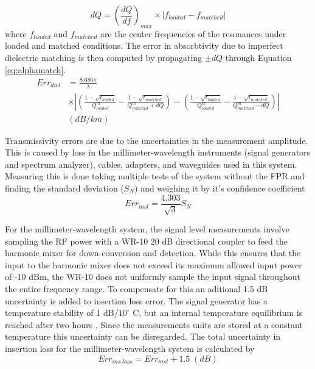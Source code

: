 \begin{equation}
dQ = \left(\frac{dQ}{df} \right)_{max} \times |f_{loaded} - f_{matched}|
\end{equation}
where $f_{loaded}$ and $ f_{matched}$ are the center frequencies of the resonances under loaded and matched conditions. The error in absorbtivity due to imperfect dielectric matching is then computed by propagating $\pm dQ$ through Equation \ref{eq:alphamatch}.
\begin{equation}
\begin{split}
Err_{diel} &= \frac{8.686 \pi}{\lambda} 
\\ &\times \left| \left( \frac{1-\sqrt{t_{loaded}}}{Q^m_{loaded}} - \frac{1-\sqrt{t_{matched}}}{Q^m_{matched} + dQ} \right) - \left( \frac{1-\sqrt{t_{loaded}}}{Q^m_{loaded}} - \frac{1-\sqrt{t_{matched}}}{Q^m_{matched} - dQ} \right) \right|\\
 &(dB/km)
\end{split}
\end{equation}

Transmissivity errors are due to the uncertainties in the measurement amplitude. This is caused by loss in the millimeter-wavelength instruments (signal generators and spectrum analyzer), cables, adapters, and waveguides used in this system. Measuring this is done taking multiple tests of the system without the FPR and finding the standard deviation ($S_N$) and weighing it by it's confidence coefficient
\begin{equation}
Err_{msl} = \frac{4.303}{\sqrt{3}}S_N
\end{equation}

For the millimeter-wavelength system, the signal level measurements involve sampling the RF power with a WR-10 20 dB directional coupler to feed the harmonic mixer for down-conversion and detection. While this ensures that the input to the harmonic mixer does not exceed its maximum allowed input power of -10 dBm, the WR-10 does not uniformly sample the input signal throughout the entire frequency range. To compensate for this an aditional 1.5 dB uncertainty is added to insertion loss error. The signal generator has a temperature stability of 1 dB/$10^\circ$ C, but an internal temperature equilibrium is reached after two hours \cite{Hewlett-Packard}. Since the measurements units are stored at a constant temperature this uncertainty can be disregarded. The total uncertainty in insertion loss for the millimeter-wavelength system is calculated by
\begin{equation}
Err_{ins\;loss} = Err_{msl} +1.5\;(dB)
\end{equation}

